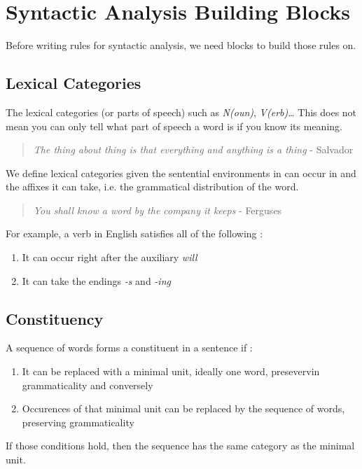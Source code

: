 \documentclass{cours}
\begin{document}
\section{Syntactic Analysis Building Blocks}
Before writing rules for syntactic analysis, we need blocks to build those rules on.

\subsection{Lexical Categories}
The lexical categories (or parts of speech) such as \textsl{N(oun)}, \textsl{V(erb)}\dots 
This does not mean you can only tell what part of speech a word is if you know its meaning.\\
\begin{quotation}
    \textit{The thing about thing is that everything and anything is a thing} - Salvador
\end{quotation}

\begin{definition}
    We define lexical categories given the sentential environments in can occur in and the affixes it can take, i.e. the grammatical distribution of the word.
\end{definition}
\begin{quotation}
    \textit{You shall know a word by the company it keeps} - Ferguses
\end{quotation}
For example, a verb in English satisfies all of the following :
\begin{enumerate}
    \item It can occur right after the auxiliary \textsl{will}
    \item It can take the endings \textsl{-s} and \textsl{-ing}
\end{enumerate}

\subsection{Constituency}
\begin{definition}[A Heuristic]
    A sequence of words forms a constituent in a sentence if :
    \begin{enumerate}
        \item It can be replaced with a minimal unit, ideally one word, presevervin grammaticality and conversely
        \item Occurences of that minimal unit can be replaced by the sequence of words, preserving grammaticality
    \end{enumerate}
    If those conditions hold, then the sequence has the same category as the minimal unit. 
\end{definition}
\end{document}
